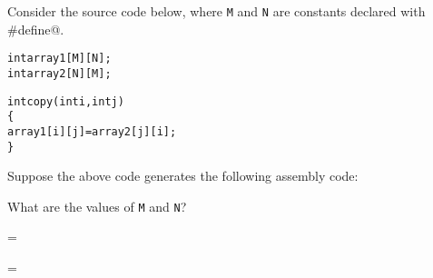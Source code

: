 \begin{problem}{8}

Consider the source code below, where {\tt M} and {\tt N} are
constants declared with \verb@#define@.

\begin{ccode}
\begin{alltt}
int array1[M][N];
int array2[N][M];

int copy(int i, int j)
\verb:{:
    array1[i][j] = array2[j][i];
\verb:}:
\end{alltt}
\end{ccode}

Suppose the above code generates the following assembly code:



What are the values of {\tt M} and {\tt N}?       

\bigskip
\hspace{1cm}{\tt M} =

\bigskip
\hspace{1cm}{\tt N} =


\end{problem}

